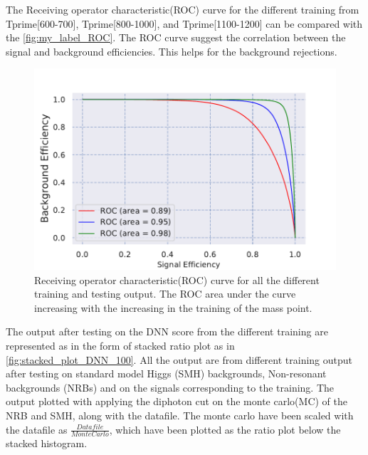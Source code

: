 The Receiving operator characteristic(ROC) curve for the different training from Tprime[600-700], Tprime[800-1000], and Tprime[1100-1200] can be compared with the \autoref{fig:my_label_ROC}. The ROC curve suggest the correlation between the signal and background efficiencies. This helps for the background rejections. 
\begin{figure}[H]
    \centering
    \includegraphics{Results_outputs/ROC_curve_Comaprision_Different_training.pdf}
    \caption{ Receiving operator characteristic(ROC) curve for all the different training and testing output. The ROC area under the curve increasing with the increasing in the training of the mass point.}
    \label{fig:my_label_ROC}
\end{figure}


The output after testing on the DNN score from the different training are represented as in the form of stacked ratio plot as in \autoref{fig:stacked_plot_DNN_100}. All the output are from different training output after testing on standard model Higgs (SMH) backgrounds, Non-resonant backgrounds (NRBs) and on the signals corresponding to the training. The output plotted with applying the diphoton cut on  the monte carlo(MC) of the NRB and SMH, along with the datafile. The monte carlo have been scaled with the datafile as $\frac{Datafile}{MonteCarlo}$, which have been plotted as the ratio plot below the stacked histogram.\\

